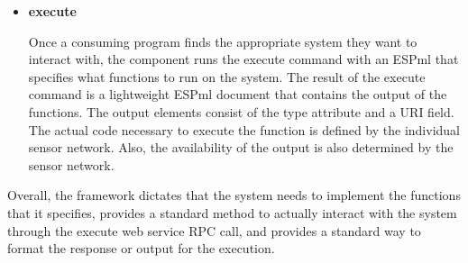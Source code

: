 \begin{itemize}

\item \textbf{execute}

Once a consuming program finds the appropriate system they want to interact with, the component runs the
execute command with an ESPml that specifies what functions to run on the system.  The result of the execute command is a lightweight ESPml document
that contains the output of the functions.  The output elements consist of the type attribute and a URI field.  The actual code necessary
to execute the function is defined by the individual sensor network.  Also, the availability of the output is also determined by the
sensor network.  
\end{itemize}
Overall, the framework dictates that the system needs to implement the functions that it specifies, provides a standard method
to actually interact with the system through the execute web service RPC call, and provides a standard way to format the response or output
for the execution.

